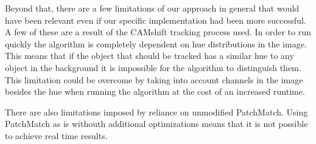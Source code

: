 \documentclass[12pt]{article}
\begin{document}
Beyond that, there are a few limitations of our approach in general that would have been relevant even if our specific implementation had been more successful. A few of these are a result of the CAMshift tracking process used. In order to run quickly the algorithm is completely dependent on hue distributions in the image. This means that if the object that should be tracked has a similar hue to any object in the background it is impossible for the algorithm to distinguish them. This limitation could be overcome by taking into account channels in the image besides the hue when running the algorithm at the cost of an increased runtime. 

There are also limitations imposed by reliance on unmodified PatchMatch. Using PatchMatch as is withouth additional optimizations means that it is not possible to achieve real time results.
\end{document}
